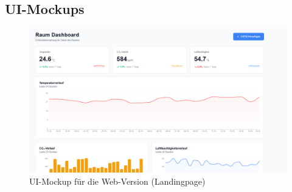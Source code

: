 \documentclass{article}
\begin{document}
\subsection{UI-Mockups}

\begin{figure}[H]
  \centering
  \includegraphics[width=\textwidth]{UI_Mockup_Web.png}
  \caption{UI-Mockup für die Web-Version (Landingpage)}
  \label{fig:ui-mockup-web}
\end{figure}
\end{document}
